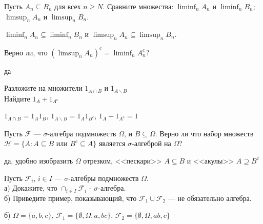 \begin{problem}
Пусть $A_{n} \subseteq B_{n}$ для всех $n\ge N$. Сравните множества: $\liminf_{n}A_{n}$ и $\liminf_{n}B_{n}$;
$\limsup_{n}A_{n}$ и $\limsup_{n}B_{n}$.

\begin{sol}
$\liminf_{n}A_{n} \subseteq \liminf_{n}B_{n}$ и $\limsup_{n}A_{n}
\subseteq \limsup_{n}B_{n}$.
\end{sol}
\end{problem}

\begin{problem}
Верно ли, что $\left(\limsup_{n}A_{n}\right)^{c}=\liminf_{n}A_{n}^{c}$?

\begin{sol}
да
\end{sol}
\end{problem}

\begin{problem}
Разложите на множители $1_{A\cap B}$ и $1_{A\backslash B}$ \\
Найдите $1_{A}+1_{A^{c}}$

\begin{sol}
 $1_{A\cap B}=1_{A}1_{B}$, $1_{A\backslash B}=1_{A}1_{B^{c}}$, $1_{A}+1_{A^{c}}=1$
\end{sol}
\end{problem}

\begin{problem}
Пусть $\mathcal{F}$ — $\sigma$-алгебра подмножеств $\Omega$, и
$B\subseteq\Omega$. Верно ли что набор множеств
$\mathcal{H}=\{A:A\subseteq B$ или $B^{c}\subseteq A\}$ является
$\sigma$-алгеброй на $\Omega$?

\begin{sol}
да, удобно изобразить $\Omega$ отрезком, <<пескари>> $A\subseteq B$ и <<акулы>> $A \supseteq B^{c}$
\end{sol}
\end{problem}

\begin{problem}
Пусть $\mathcal{F}_{i}$, $i\in I$ — $\sigma$-алгебры подмножеств
$\Omega$. \\
а) Докажите, что $\cap_{i\in I}\mathcal{F}_{i}$ -
$\sigma$-алгебра. \\
б) Приведите пример, показывающий, что
$\mathcal{F}_{1}\cup\mathcal{F}_{2}$ — не обязательно алгебра.

\begin{sol}
 б) $\Omega=\{a,b,c\}$, $\mathcal{F}_{1}=\{\emptyset,\Omega,a,bc\}$, $\mathcal{F}_{2}=\{\emptyset,\Omega,ab,c\}$
\end{sol}
\end{problem}


